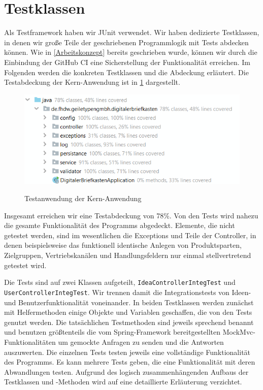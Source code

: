 

\section{Testklassen}

Als Testframework haben wir JUnit verwendet. Wir haben dedizierte Testklassen, in denen wir große Teile der geschriebenen Programmlogik mit Tests abdecken können. Wie in \cref{Arbeitskonzept} bereits geschrieben wurde, können wir durch die Einbindung der GitHub CI eine Sicherstellung der Funktionalität erreichen.
Im Folgenden werden die konkreten Testklassen und die Abdeckung erläutert. Die Testabdeckung der Kern-Anwendung ist in \cref{fig:coverage} dargestellt.

\begin{figure}[h!!]
    \centering
    \begin{minipage}[t]{1\textwidth}
        \caption{Testanwendung der Kern-Anwendung}
        \includegraphics[width=1\textwidth]{img/coverage.png}\\
        \label{fig:coverage}
    \end{minipage}
\end{figure}

Insgesamt erreichen wir eine Testabdeckung von 78\%. Von den Tests wird nahezu die gesamte Funktionalität des Programms abgedeckt. Elemente, die nicht getestet werden, sind im wesentlichen die Exceptions und Teile der Controller, in denen beispielsweise das funktionell identische Anlegen von Produktsparten, Zielgruppen, Vertriebskanälen und Handlungsfeldern nur einmal stellvertretend getestet wird.

Die Tests sind auf zwei Klassen aufgeteilt, \texttt{IdeaControllerIntegTest} und \texttt{UserControllerIntegTest}. Wir trennen damit die Integrationstests von Ideen- und Benutzerfunktionalität voneinander. In beiden Testklassen werden zunächst mit Helfermethoden einige Objekte und Variablen geschaffen, die von den Tests genutzt werden.
Die tatsächlichen Testmethoden sind jeweils sprechend benannt und benutzen größtenteils die vom Spring-Framework bereitgestellten MockMvc-Funktionalitäten um gemockte Anfragen zu senden und die Antworten auszuwerten. Die einzelnen Tests testen jeweils eine vollständige Funktionalität des Programms. Es kann mehrere Tests geben, die eine Funktionalität mit deren Abwandlungen testen.
Aufgrund des logisch zusammenhängenden Aufbaus der Testklassen und -Methoden wird auf eine detaillierte Erläuterung verzichtet.


